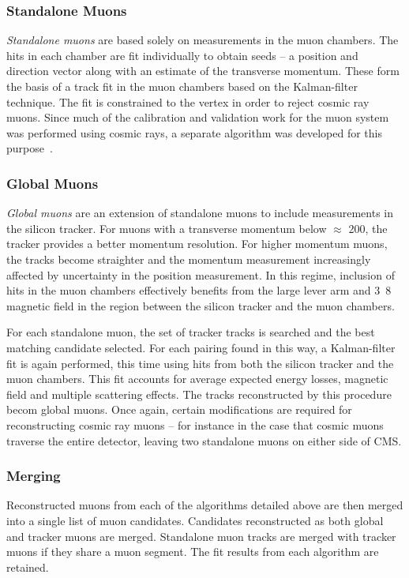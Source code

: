 \subsubsection{Standalone Muons}
\emph{Standalone muons} are based solely on measurements in the muon chambers. The hits
in each chamber are fit individually to obtain seeds -- a position and direction
vector along with an estimate of the transverse momentum. These form the basis
of a track fit in the muon chambers based on the Kalman-filter technique. The
fit is constrained to the vertex in order to reject cosmic ray muons. Since much
of the calibration and validation work for the muon system was performed using
cosmic rays, a separate algorithm was developed for this purpose~\cite{cms_mu_reco_cosmic}.

\subsubsection{Global Muons}
\emph{Global muons} are an extension of standalone muons to include measurements
in the silicon tracker. For muons with a transverse momentum below $\approx$
\unit{200}{\GeV}, the tracker provides a better momentum resolution. For higher
momentum muons, the tracks become straighter and the momentum measurement
increasingly affected by uncertainty in the position measurement. In this
regime, inclusion of hits in the muon chambers effectively benefits from the
large lever arm and \unit{3.8}{\tesla} magnetic field in the region between the
silicon tracker and the muon chambers.

For each standalone muon, the set of tracker tracks is searched and the best
matching candidate selected. For each pairing found in this way, a Kalman-filter
fit is again performed, this time using hits from both the silicon tracker and
the muon chambers. This fit accounts for average expected energy losses,
magnetic field and multiple scattering effects. The tracks reconstructed by this
procedure becom global muons. Once again, certain modifications are required for
reconstructing cosmic ray muons -- for instance in the case that cosmic muons
traverse the entire detector, leaving two standalone muons on either side of
\ac{CMS}.

\subsubsection{Merging}
Reconstructed muons from each of the algorithms detailed above are then merged
into a single list of muon candidates. Candidates reconstructed as both global
and tracker muons are merged. Standalone muon tracks are merged with tracker
muons if they share a muon segment. The fit results from each algorithm are
retained.

